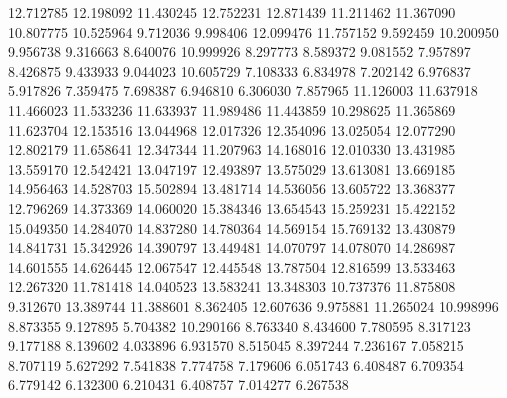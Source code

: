 12.712785
12.198092
11.430245
12.752231
12.871439
11.211462
11.367090
10.807775
10.525964
9.712036
9.998406
12.099476
11.757152
9.592459
10.200950
9.956738
9.316663
8.640076
10.999926
8.297773
8.589372
9.081552
7.957897
8.426875
9.433933
9.044023
10.605729
7.108333
6.834978
7.202142
6.976837
5.917826
7.359475
7.698387
6.946810
6.306030
7.857965
11.126003
11.637918
11.466023
11.533236
11.633937
11.989486
11.443859
10.298625
11.365869
11.623704
12.153516
13.044968
12.017326
12.354096
13.025054
12.077290
12.802179
11.658641
12.347344
11.207963
14.168016
12.010330
13.431985
13.559170
12.542421
13.047197
12.493897
13.575029
13.613081
13.669185
14.956463
14.528703
15.502894
13.481714
14.536056
13.605722
13.368377
12.796269
14.373369
14.060020
15.384346
13.654543
15.259231
15.422152
15.049350
14.284070
14.837280
14.780364
14.569154
15.769132
13.430879
14.841731
15.342926
14.390797
13.449481
14.070797
14.078070
14.286987
14.601555
14.626445
12.067547
12.445548
13.787504
12.816599
13.533463
12.267320
11.781418
14.040523
13.583241
13.348303
10.737376
11.875808
9.312670
13.389744
11.388601
8.362405
12.607636
9.975881
11.265024
10.998996
8.873355
9.127895
5.704382
10.290166
8.763340
8.434600
7.780595
8.317123
9.177188
8.139602
4.033896
6.931570
8.515045
8.397244
7.236167
7.058215
8.707119
5.627292
7.541838
7.774758
7.179606
6.051743
6.408487
6.709354
6.779142
6.132300
6.210431
6.408757
7.014277
6.267538
